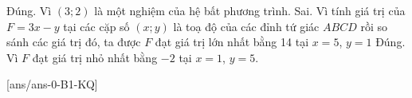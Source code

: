 \begin{ex}
{\begin{itemchoice}
\begin{center}
	\end{center}
		\itemch Đúng. Vì $\left(3 ; 2\right)$ là một nghiệm của hệ bất phương trình.
		\itemch Sai. Vì tính giá trị của $F=3 x-y$ tại các cặp số $(x ; y)$ là toạ độ của các đỉnh tứ giác $A B C D$ rồi so sánh các giá trị đó, ta được $F$ đạt giá trị lớn nhất bằng 14 tại $x=5$, $y=1$
		\itemch Đúng. Vì $F$ đạt giá trị nhỏ nhất bằng $-2$ tại $x=1$, $y=5$.
	\end{itemchoice}
	}
\end{ex}


[ans/ans-0-B1-KQ]
\caukq

